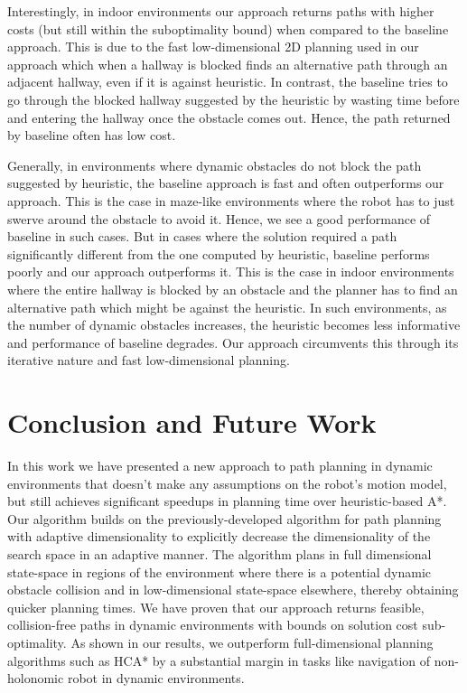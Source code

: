 Interestingly, in indoor environments our approach returns paths with higher costs (but still within the suboptimality bound) when compared to the baseline approach. This is due to the fast low-dimensional 2D planning used in our approach which when a hallway is blocked finds an alternative path through an adjacent hallway, even if it is against heuristic. In contrast, the baseline tries to go through the blocked hallway suggested by the heuristic by wasting time before and entering the hallway once the obstacle comes out. Hence, the path returned by baseline often has low cost.

Generally, in environments where dynamic obstacles do not block the path suggested by heuristic, the baseline approach is fast and often outperforms our approach. This is the case in maze-like environments where the robot has to just swerve around the obstacle to avoid it. Hence, we see a good performance of baseline in such cases. But in cases where the solution required a path significantly different from the one computed by heuristic, baseline performs poorly and our approach outperforms it. This is the case in indoor environments where the entire hallway is blocked by an obstacle and the planner has to find an alternative path which might be against the heuristic. In such environments, as the number of dynamic obstacles increases, the heuristic becomes less informative and performance of baseline degrades. Our approach circumvents this through its iterative nature and fast low-dimensional planning.

\section{Conclusion and Future Work}\label{sec:ppad-conclusion}

In this work we have presented a new approach to path planning in dynamic environments that doesn't make any assumptions on the robot's motion model, but still achieves significant speedups in planning time over heuristic-based A*.
Our algorithm builds on the previously-developed algorithm for path planning with adaptive dimensionality to explicitly decrease the dimensionality of the search space in an adaptive manner.
The algorithm plans in full dimensional state-space in regions of the environment where there is a potential dynamic obstacle collision and in low-dimensional state-space elsewhere, thereby obtaining quicker planning times.
 We have proven that our approach returns feasible, collision-free paths in dynamic environments with bounds on solution cost sub-optimality. As shown in our results, we outperform full-dimensional planning algorithms such as HCA* by a substantial margin in tasks like navigation of non-holonomic robot in dynamic environments. 

